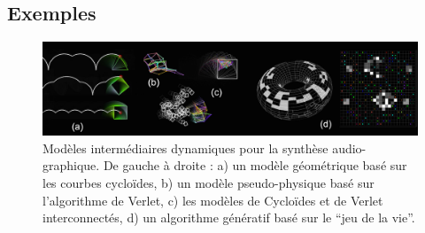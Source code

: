 \subsection{Exemples}
\label{sec:algorithms:MID:examples}

\begin{figure}[!htbp]
	\captionsetup{format=plain}
	\includegraphics[width=\textwidth]{gfx/04_algorithms/OrJo_MID_1200x300px.png}
	\caption[Modèles intermédiaires dynamiques pour la synthèse audio-graphique]{Modèles intermédiaires dynamiques pour la synthèse audio-graphique. De gauche à droite : a) un modèle géométrique basé sur les courbes cycloïdes, b) un modèle pseudo-physique basé sur l'algorithme de Verlet, c) les modèles de Cycloïdes et de Verlet interconnectés, d) un algorithme génératif basé sur le ``jeu de la vie''.}
	\label{fig:algorithms:MP-MID}
\end{figure}

